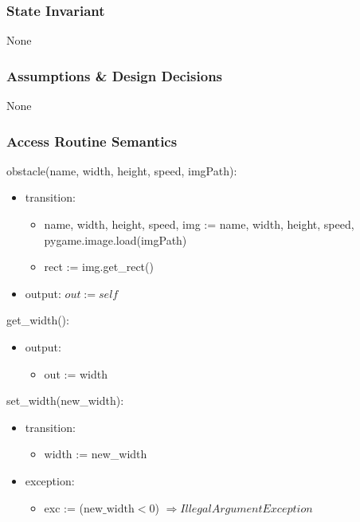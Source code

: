 \documentclass[12pt]{article}
\begin{document}
\subsubsection* {State Invariant}

None

\subsubsection* {Assumptions \& Design Decisions}

None

\subsubsection* {Access Routine Semantics}

\noindent obstacle(name, width, height, speed, imgPath):
\begin{itemize}
    \item transition: 
    \begin{itemize}[]
        \item name, width, height, speed, img := name, width, height, speed, pygame.image.load(imgPath)
        \item rect := img.get\_rect()
    \end{itemize}
    \item output: $out := self$
\end{itemize}

\noindent get\_width():
\begin{itemize}
    \item output: 
    \begin{itemize}[]
        \item out := width 
    \end{itemize}
\end{itemize}


\noindent set\_width(new\_width):
\begin{itemize}
    \item transition: 
    \begin{itemize}[]
        \item width := new\_width 
    \end{itemize}

    \item exception:
        \begin{itemize}[]
            \item exc := ($\text{new\_width} < 0$) $\Rightarrow  IllegalArgumentException$
        \end{itemize}
\end{itemize}
\end{document}

